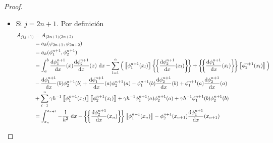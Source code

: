 \documentclass[10pt,a4paper]{report}
\newcommand{\dx}{\textup{d}x}
\providecommand{\Dx}[1]{\frac{\textup{d} #1}{\textup{d}x}}
\providecommand{\salto}[1]{\left\llbracket#1\right\rrbracket}
\providecommand{\prom}[1]{\left \{\!\left \{#1\right \}\!\right \}}
\begin{document}
\begin{proof}
\begin{itemize}
\begin{itemize}
\begin{align*}
                	       &= a_{h}(\phi^{1}_{2},\phi^{2}_{1})\\
                	       &= \int_{a}^{b} \Dx{\phi^{1}_{2}}(x)\Dx{\phi^{2}_{1}}(x)\ \dx - \sum_{l=1}^{n}\Big(\salto{\phi^{1}_{2}(x_{l})}\prom{\Dx{\phi^{2}_{1}}(x_{l})} + \prom{\Dx{\phi^{1}_{2}}(x_{l})}\salto{\phi^{2}_{1}(x_{l})}\Big)\\
                	       &-\Dx{\phi^{1}_{2}}(b)\phi^{2}_{1}(b) + \Dx{\phi^{1}_{2}}(a)\phi^{2}_{1}(a) - \phi^{1}_{2}(b)\Dx{\phi^{2}_{1}}(b) + \phi^{1}_{2}(a)\Dx{\phi^{2}_{1}}(a) + \sum_{l=1}^{n}\gamma h^{-1}\salto{\phi^{1}_{2}(x_{l})}\salto{\phi^{2}_{1}(x_{l})}\\
                	       &+ \gamma h^{-1}\phi^{1}_{2}(a)\phi^{2}_{1}(a) + \gamma h^{-1}\phi^{1}_{2}(b)\phi^{2}_{1}(b) \\
                	       &= -2\salto{\phi^{1}_{2}(x_{1})}\prom{\Dx{\phi^{2}_{1}}(x_{1})} + \gamma h^{-1}\salto{\phi^{1}_{2}(x_{1})}\salto{\phi^{2}_{1}(x_{1})}\\
                	       &= \frac{1}{h} -\frac{\gamma}{h}\\
                	       &= \frac{1}{h}\left(1-\gamma\right)
                \end{align*}
                \item Si $j=2n+1$. Por definición
                \begin{align*}
                	A_{j(j+1)} &= A_{(2n+1)(2n+2)} \\
                	&= a_{h}(\varphi_{2n+1},\varphi_{2n+2})\\ 
                	&= a_{h}(\phi^{n+1}_{1},\phi^{n+1}_{2})\\
                	&=  \int_{a}^{b} \Dx{\phi^{n+1}_{1}}(x)\Dx{\phi^{n+1}_{2}}(x)\ \dx - \sum_{l=1}^{n}\Big(\salto{\phi^{n+1}_{1}(x_{l})}\prom{\Dx{\phi^{n+1}_{2}}(x_{l})} + \prom{\Dx{\phi^{n+1}_{1}}(x_{l})}\salto{\phi^{n+1}_{2}(x_{l})}\Big)\\
                	&-\Dx{\phi^{n+1}_{1}}(b)\phi^{n+1}_{2}(b) + \Dx{\phi^{n+1}_{1}}(a)\phi^{n+1}_{2}(a) - \phi^{n+1}_{1}(b)\Dx{\phi^{n+1}_{2}}(b) + \phi^{n+1}_{1}(a)\Dx{\phi^{n+1}_{2}}(a)\\ &+ \sum_{l=1}^{n}\gamma h^{-1}\salto{\phi^{n+1}_{1}(x_{l})}\salto{\phi^{n+1}_{2}(x_{l})}
                	+ \gamma h^{-1}\phi^{n+1}_{1}(a)\phi^{n+1}_{2}(a) + \gamma h^{-1}\phi^{n+1}_{1}(b)\phi^{n+1}_{2}(b)\\
                	&= \int_{x_{n}}^{x_{n+1}} -\frac{1}{h^{2}}\ \dx -\prom{\Dx{\phi^{n+1}_{2}}(x_{n})}\salto{\phi^{n+1}_{1}(x_{n})} - \phi^{n+1}_{2}(x_{n+1})\Dx{\phi^{n+1}_{1}}(x_{n+1}) \\

\end{align*}
\end{itemize}
\end{itemize}
\end{proof}
\end{document}
